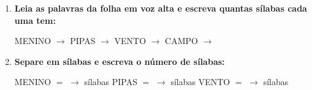 \begin{exercicio}
\begin{enumerate}[resume]
  \item \textbf{Leia as palavras da folha em voz alta e escreva quantas sílabas cada uma tem:}

  \begin{center}
  MENINO $\rightarrow$ \underline{\hspace{1cm}} \quad PIPAS $\rightarrow$ \underline{\hspace{1cm}} \quad VENTO $\rightarrow$ \underline{\hspace{1cm}} \quad CAMPO $\rightarrow$ \underline{\hspace{1cm}}
  \end{center}

  \item \textbf{Separe em sílabas e escreva o número de sílabas:}
  \begin{center}
  MENINO $=$ \underline{\hspace{1.2cm}} $\rightarrow$ \underline{\hspace{0.8cm}} sílabas \quad PIPAS $=$ \underline{\hspace{1.2cm}} $\rightarrow$ \underline{\hspace{0.8cm}} sílabas \quad VENTO $=$ \underline{\hspace{1.2cm}} $\rightarrow$ \underline{\hspace{0.8cm}} sílabas
  \end{center}

\end{enumerate}

\end{exercicio}



